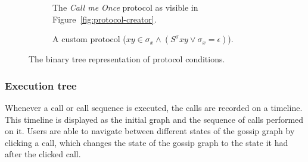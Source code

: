 \begin{figure}[htb!]
    \begin{subfigure}[t]{.45\linewidth}
        \centering
        \caption{The \emph{Call me Once} protocol as visible in Figure~\ref{fig:protocol-creator}.}
    \end{subfigure}
    \hfill
    \begin{subfigure}[t]{.5\linewidth}
        \centering
        \caption{A custom protocol (\( xy \in \sigma_x \land ( S^\sigma xy \lor \sigma_x = \epsilon ) \)).}
    \end{subfigure}
    \caption{The binary tree representation of protocol conditions.}
    \label{fig:logic-tree}
\end{figure}

\subsubsection{Execution tree}

Whenever a call or call sequence is executed, the calls are recorded on a timeline.
This timeline is displayed as the initial graph and the sequence of calls performed on it.
Users are able to navigate between different states of the gossip graph by clicking a call,
which changes the state of the gossip graph to the state it had after the clicked call.

